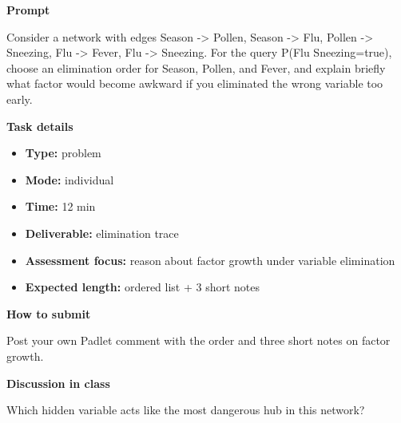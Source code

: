 \documentclass[11pt]{article}
\begin{document}
\begin{tcolorbox}[colback=white,colframe=MidnightBlue,title={Q3 Structured Problem},fonttitle=\bfseries,breakable]
\begin{center}
\end{center}

{\large\bfseries\color{MidnightBlue} Prompt}\par\medskip
Consider a network with edges Season -\textgreater{} Pollen, Season -\textgreater{} Flu, Pollen -\textgreater{} Sneezing, Flu -\textgreater{} Fever, Flu -\textgreater{} Sneezing. For the query P(Flu \textbar{} Sneezing=true), choose an elimination order for Season, Pollen, and Fever, and explain briefly what factor would become awkward if you eliminated the wrong variable too early.

{\large\bfseries\color{MidnightBlue} Task details}\par\medskip
\begin{itemize}\item \textbf{Type:} problem
\item \textbf{Mode:} individual
\item \textbf{Time:} 12 min
\item \textbf{Deliverable:} elimination trace
\item \textbf{Assessment focus:} reason about factor growth under variable elimination
\item \textbf{Expected length:} ordered list + 3 short notes\end{itemize}

{\large\bfseries\color{MidnightBlue} How to submit}\par\medskip
Post your own Padlet comment with the order and three short notes on factor growth.

{\large\bfseries\color{MidnightBlue} Discussion in class}\par\medskip
Which hidden variable acts like the most dangerous hub in this network?


\end{tcolorbox}
\end{document}
